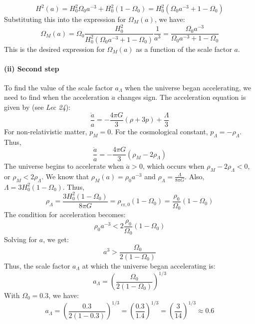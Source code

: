 \documentclass{article}
\begin{document}
\begin{equation}
H^2(a) = H_0^2 \Omega_0 a^{-3} + H_0^2(1-\Omega_0) = H_0^2 \left( \Omega_0 a^{-3} + 1 - \Omega_0 \right)
\end{equation}
Substituting this into the expression for $\Omega_M(a)$, we have:
\begin{equation}\label{eq:Omega_M}
\Omega_M(a) = \Omega_0 \frac{H_0^2}{H_0^2 \left( \Omega_0 a^{-3} + 1 - \Omega_0 \right)} \frac{1}{a^3} = \frac{\Omega_0 a^{-3}}{\Omega_0 a^{-3} + 1 - \Omega_0}
\end{equation}
This is the desired expression for $\Omega_M(a)$ as a function of the scale factor $a$.

\paragraph{(ii) Second step}
To find the value of the scale factor $a_\Lambda$ when the universe began accelerating, we need to find when the acceleration $\ddot{a}$ changes sign. The acceleration equation is given by (see \emph{Lec 24}):
\begin{equation}
\frac{\ddot{a}}{a} = -\frac{4\pi G}{3} (\rho + 3p) + \frac{\Lambda}{3}
\end{equation}
For non-relativistic matter, $p_M = 0$. For the cosmological constant, $p_\Lambda = -\rho_\Lambda$. Thus,
\begin{equation}
\frac{\ddot{a}}{a} = -\frac{4\pi G}{3} (\rho_M - 2\rho_\Lambda)
\end{equation}
The universe begins to accelerate when $\ddot{a} > 0$, which occurs when $\rho_M - 2\rho_\Lambda < 0$, or $\rho_M < 2\rho_\Lambda$.
We know that $\rho_M(a) = \rho_0 a^{-3}$ and $\rho_\Lambda = \frac{\Lambda}{8\pi G}$. Also, $\Lambda = 3H_0^2(1-\Omega_0)$. Thus,
\begin{equation}
\rho_\Lambda = \frac{3H_0^2(1-\Omega_0)}{8\pi G} = \rho_{\text{cr},0} (1-\Omega_0) = \frac{\rho_0}{\Omega_0} (1-\Omega_0)
\end{equation}
The condition for acceleration becomes:
\begin{equation}
\rho_0 a^{-3} < 2 \frac{\rho_0}{\Omega_0} (1-\Omega_0)
\end{equation}
Solving for $a$, we get:
\begin{equation}
a^3 > \frac{\Omega_0}{2(1-\Omega_0)}
\end{equation}
Thus, the scale factor $a_\Lambda$ at which the universe began accelerating is:
\begin{equation}
a_\Lambda = \left( \frac{\Omega_0}{2(1-\Omega_0)} \right)^{1/3}
\end{equation}
With $\Omega_0 = 0.3$, we have:
\begin{equation}
a_\Lambda = \left( \frac{0.3}{2(1-0.3)} \right)^{1/3} = \left( \frac{0.3}{1.4} \right)^{1/3} = \left( \frac{3}{14} \right)^{1/3} \approx 0.6
\end{equation}
\end{document}
